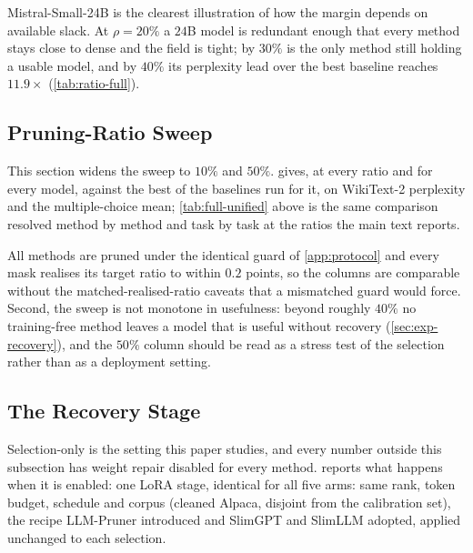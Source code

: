 Mistral-Small-24B is the clearest illustration of how the margin depends on available slack. At
$\rho{=}20\%$ a $24$B model is redundant enough that every method stays close to dense and the field
is tight; by $30\%$ \method is the only method still holding a usable model, and by $40\%$ its
perplexity lead over the best baseline reaches $11.9\times$
(\cref{tab:ratio-full}).


\subsection{Pruning-Ratio Sweep}

\label{app:ratio}
This section widens the sweep to $10\%$ and $50\%$.  gives, at every ratio and
for every model, \method against the best of the baselines run for it, on WikiText-2 perplexity and
the multiple-choice mean; \cref{tab:full-unified} above is the same comparison resolved method by
method and task by task at the ratios the main text reports.

All methods are pruned under the identical guard of
\cref{app:protocol} and every mask realises its target ratio to within $0.2$ points, so the columns are
comparable without the matched-realised-ratio caveats that a mismatched guard would force. Second, the
sweep is not monotone in usefulness: beyond roughly $40\%$ no training-free method leaves a model that
is useful without recovery (\cref{sec:exp-recovery}), and the $50\%$ column should be read as a
stress test of the selection rather than as a deployment setting.

\begin{table}[htbp]
\centering
\caption{\textbf{Ratio sweep}, WikiText-2 perplexity\,/\,multiple-choice mean (\%). ``Best base.'' is
the per-ratio best of every baseline run for that model; bold marks the better of the two in each
half of a cell. Selection-only throughout: no compensation, no recovery. The mean is over the
eight multiple-choice tasks present at every ratio for every model, which is why it is comparable down
the column as well as across it; a dash marks a cell with no run. Mistral-Small-24B carries one
baseline at $\rho{=}10\%$ and five at $\rho{=}50\%$, so its ``best base.'' is over fewer methods at
those two ratios than at the three the main text reports.}
\label{tab:ratio-full}

\end{table}


\subsection{The Recovery Stage}
\label{app:recovery}
Selection-only is the setting this paper studies, and every number outside this subsection has
weight repair disabled for every method.  reports what happens when it is enabled:
one LoRA stage, identical for all five arms: same rank, token budget, schedule and corpus (cleaned
Alpaca, disjoint from the calibration set), the recipe LLM-Pruner introduced and SlimGPT and SlimLLM
adopted, applied unchanged to each selection.

